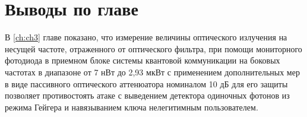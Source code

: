 \pagebreak
\section{Выводы по главе} \label{ch:ch3/sect7}


В \ref{ch:ch3} главе показано, что измерение величины оптического излучения на несущей частоте, отраженного от оптического фильтра, при помощи мониторного фотодиода в приемном блоке системы квантовой коммуникации на боковых частотах в диапазоне от 7 нВт до 2,93 мкВт с применением дополнительных мер в виде пассивного оптического аттенюатора номиналом 10 дБ для его защиты позволяет противостоять атаке с выведением детектора одиночных фотонов из режима Гейгера и навязыванием ключа нелегитимным пользователем. 
  